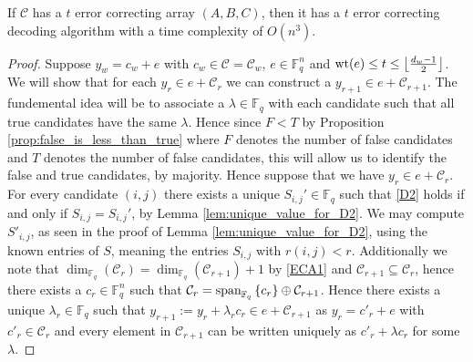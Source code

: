 \begin{theorem}\label{thm:}
If $\mathcal{C}$ has a $t$ error correcting array $(A, B, C)$, then it has a $t$ error correcting decoding algorithm with a time complexity of $O(n^{3})$.
\end{theorem}
\begin{proof}
  Suppose $y_{w} = c_{w} + e$ with $c_{w} \in \mathcal{C} = \mathcal{C}_{w}$, $e \in \mathbb{F}_q^{n}$ and $\mathrm{wt}(e) \leq t \leq \left\lfloor\frac{d_w - 1}{2}\right\rfloor$. We will show that for each $y_{r} \in e + \mathcal{C}_r$ we can construct a $y_{r + 1} \in e + \mathcal{C}_{r + 1}$. The fundemental idea will be to associate a $\lambda \in \mathbb{F}_q$ with each candidate such that all true candidates have the same $\lambda$. Hence since $F < T$ by Proposition \ref{prop:false_is_less_than_true} where $F$ denotes the number of false candidates and $T$ denotes the number of false candidates, this will allow us to identify the false and true candidates, by majority.
  Hence suppose that we have $y_r \in e + \mathcal{C}_{r}$. For every candidate $(i, j)$ there exists a unique $S_{i, j}' \in \mathbb{F}_q$ such that \ref{D2} holds if and only if $S_{i, j} = S_{i, j}'$, by Lemma \ref{lem:unique_value_for_D2}. We may compute $S'_{i,j}$, as seen in the proof of Lemma \ref{lem:unique_value_for_D2}, using the known entries of $S$, meaning the entries $S_{i,j}$ with $r(i, j) < r$.
  Additionally we note that $\dim_{\mathbb{F}_q} (\mathcal{C}_r) = \dim_{\mathbb{F}_q}(\mathcal{C}_{r + 1}) + 1$ by \ref{ECA1} and $\mathcal{C}_{r + 1} \subseteq \mathcal{C}_{r}$, hence there exists a $c_r \in \mathbb{F}_q^{n}$ such that $\mathcal{C}_r = \textnormal{span}_{\mathbb{F}_q} \left\{c_r\right\} \oplus \mathcal{C}_{r + 1}$.
  Hence there exists a unique $\lambda_{r} \in \mathbb{F}_q$ such that $y_{r + 1} := y_r + \lambda_r c_r \in e + \mathcal{C}_{r + 1}$ as $y_r = c'_r + e$ with $c'_r \in \mathcal{C}_r$ and every element in $\mathcal{C}_{r + 1}$ can be written uniquely as $c'_r + \lambda c_r$ for some $\lambda$.


\end{proof}
